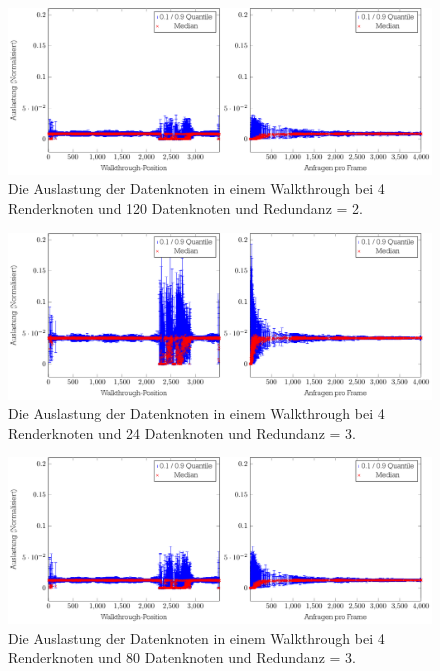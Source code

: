\begin{figure}
\centering
\includegraphics[scale=0.75]{images/diag_cCol_red2_render4_data120_2x.pdf}
\caption{\label{fig:eval:cCol3}Die Auslastung der Datenknoten in einem Walkthrough bei 4 Renderknoten und 120 Datenknoten und Redundanz = 2.}
\end{figure}

\begin{figure}
\centering
\includegraphics[scale=0.75]{images/diag_cCol_red3_render4_data24_2x.pdf}
\caption{\label{fig:eval:cCol4}Die Auslastung der Datenknoten in einem Walkthrough bei 4 Renderknoten und 24 Datenknoten und Redundanz = 3.}
\end{figure}

\begin{figure}
\centering
\includegraphics[scale=0.75]{images/diag_cCol_red3_render4_data80_2x.pdf}
\caption{\label{fig:eval:cCol5}Die Auslastung der Datenknoten in einem Walkthrough bei 4 Renderknoten und 80 Datenknoten und Redundanz = 3.}
\end{figure}

